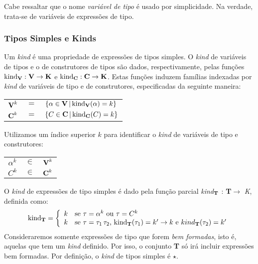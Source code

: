 Cabe ressaltar que o nome \emph{vari\'avel de tipo} \'e usado por simplicidade. Na verdade, trata-se de vari\'aveis
de express\~oes de tipo.

\subsubsection{Tipos Simples e Kinds}

Um \emph{kind} \'e uma propriedade de express\~oes de tipos simples. O \emph{kind} de vari\'aveis de tipos e o de 
construtores de tipos s\~ao dados, respectivamente, pelas fun\c{c}\~oes 
$\text{kind}_{\text{\textbf{V}}} : \text{\textbf{V}}\rightarrow\text{\textbf{K}}$ e 
$\text{kind}_{\text{\textbf{C}}} : \text{\textbf{C}}\rightarrow\text{\textbf{K}}$. Estas fun\c{c}\~oes induzem fam\'ilias
indexadas por \emph{kind} de vari\'aveis de tipo e de construtores, especificadas da seguinte maneira:
\begin{center}
	\begin{tabular}{ccl}
		$\text{\textbf{V}}^{k}$ & $=$ & $\{\alpha\in\text{\textbf{V}}\,|\,\text{kind}_{\text{\textbf{V}}}(\alpha)=k\}$\\
		$\text{\textbf{C}}^{k}$ & $=$ & $\{C\in\text{\textbf{C}}\,|\,\text{kind}_{\text{\textbf{C}}}(C)=k\}$\\
	\end{tabular}
\end{center}
Utilizamos um \'indice superior $k$ para identificar o \emph{kind} de vari\'aveis de tipo e construtores:
\begin{center}
	\begin{tabular}{ccc}
  		$\alpha^{k}$ & $\in$ & $\text{\textbf{V}}^{k}$ \\
  		$C^{k}$ & $\in$ & $\text{\textbf{C}}^{k}$ \\
  	\end{tabular}
\end{center}

O \emph{kind} de express\~oes de tipo simples \'e dado pela fun\c{c}\~ao parcial 
\emph{kind}$_{\text{\textbf{T}}}$ : \textbf{T}$\rightarrow$ \textit{K}, definida como:
\begin{equation*}
	\text{kind}_{\text{\textbf{T}}}=\left\{
		\begin{array}{ll}
			k & \text{se $\tau=\alpha^{k}$ ou $\tau = C^{k}$}\\
			k & \text{se $\tau=\tau_{1}\,\tau_{2}$, kind$_{\text{\textbf{T}}}(\tau_{1}) = k^{\prime}\rightarrow k$ e 
			      $kind_{\text{\textbf{T}}}(\tau_{2})=k^{\prime}$}
		\end{array}
	\right.
\end{equation*}
Consideraremos somente express\~oes de tipo que forem \emph{bem formadas}, isto \'e, aquelas que tem um \emph{kind} 
definido. Por isso, o conjunto \textbf{T} s\'o ir\'a incluir express\~oes bem formadas. Por defini\c{c}\~ao, o 
\emph{kind} de tipos simples \'e $\star$.

